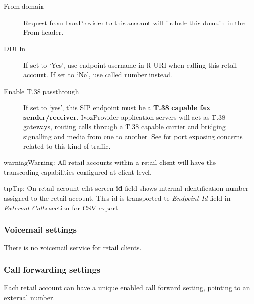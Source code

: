 \documentclass[letterpaper,10pt,english]{sphinxmanual}
\begin{document}
\begin{description}
\item[{From domain}] \leavevmode{}\label{administration_portal/client/retail/retail_accounts:term-from-domain}
Request from IvozProvider to this account will include this domain in
the From header.

\item[{DDI In}] \leavevmode{}\label{administration_portal/client/retail/retail_accounts:term-ddi-in}
If set to `Yes', use endpoint username in R-URI when calling this retail account. If set to `No', use called
number instead.

\item[{Enable T.38 passthrough}] \leavevmode{}\label{administration_portal/client/retail/retail_accounts:term-enable-t-38-passthrough}
If set to `yes', this SIP endpoint must be a \textbf{T.38 capable fax sender/receiver}. IvozProvider
application servers will act as T.38 gateways, routing calls through a T.38 capable carrier and
bridging signalling and media from one to another. See {\hyperref[security_and_maintenance/security/firewall:firewall]{}} for port exposing concerns
related to this kind of traffic.

\end{description}

\begin{notice}{warning}{Warning:}
All retail accounts within a retail client will have the transcoding capabilities configured at client level.
\end{notice}

\begin{notice}{tip}{Tip:}
On retail account edit screen \textbf{id} field shows internal identification number assigned to the retail account.
This id is transported to \emph{Endpoint Id} field in \emph{External Calls} section for CSV export.
\end{notice}


\subsubsection{Voicemail settings}
\label{administration_portal/client/retail/retail_accounts:voicemail-settings}
There is no voicemail service for retail clients.


\subsubsection{Call forwarding settings}
\label{administration_portal/client/retail/retail_accounts:call-forwarding-settings}
Each retail account can have a unique enabled call forward setting, pointing to an external number.
\end{document}
